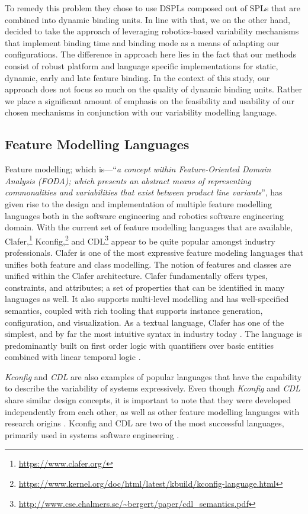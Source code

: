 \documentclass[conference]{IEEEtran}
\newcommand{\foot}[1]{\footnote{\url{#1}}}
\begin{document}
To remedy this problem they chose to use DSPLs composed out of SPLs that are combined into dynamic binding units. In line with that, we on the other hand, decided to take the approach of leveraging robotics-based variability mechanisms that implement binding time and binding mode as a means of adapting our configurations. The difference in approach here lies in the fact that our methods consist of robust platform and language specific implementations for static, dynamic, early and late feature binding. In the context of this study, our approach does not focus so much on the quality of dynamic binding units. Rather we place a significant amount of emphasis on the feasibility and usability of our chosen mechanisms in conjunction with our variability modelling language.
 
 \subsection{Feature Modelling Languages}
Feature modelling; which is---``{\em a concept within Feature-Oriented Domain Analysis (FODA)\cite{foda-tech-rep}; which presents an abstract means of representing commonalities and variabilities that exist between product line variants}'', has given rise to the design and implementation of multiple feature modelling languages both in the software engineering and robotics software engineering domain.
With the current set of feature modelling languages that
are available, Clafer,\foot{https://www.clafer.org/} Kconfig,\foot{https://www.kernel.org/doc/html/latest/kbuild/kconfig-language.html} and CDL\foot{http://www.cse.chalmers.se/~bergert/paper/cdl_semantics.pdf} appear to be quite popular amongst industry professionals. Clafer is one of the most expressive feature modeling languages that unifies both feature and class modelling. The notion of features and classes are unified within the Clafer architecture. Clafer fundamentally offers types, constraints, and attributes; a set of properties that can be identified in many languages as well. It also supports multi-level modelling and has well-specified semantics, coupled with rich tooling that supports instance generation, configuration, and visualization. As a textual language, Clafer has one of the simplest, and by far the most intuitive syntax in industry today \cite{fmod-lang-scenarios}. The language is predominantly built on first order logic with quantifiers over basic entities combined with linear temporal logic \cite{clafer}.

\textit{Kconfig} and \textit{CDL} are also examples of popular languages that have the capability to describe the variability of systems expressively. Even though \textit{Kconfig} and \textit{CDL} share similar design concepts, it is important to note that they were developed independently from each other, as well as other feature modelling languages with research origins \cite{vmir}. Kconfig and CDL are two of the most successful languages, primarily used in systems software engineering \cite{fmod-lang-scenarios}.
\end{document}
